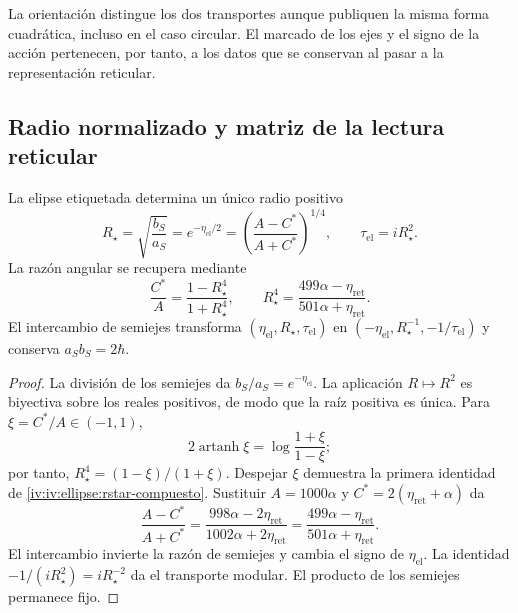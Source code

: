 La orientación distingue los dos transportes aunque publiquen
la misma forma cuadrática, incluso en el caso circular.
El marcado de los ejes y el signo de la acción pertenecen,
por tanto, a los datos que se conservan al pasar a la
representación reticular.

\subsection{Radio normalizado y matriz de la lectura reticular}
\label{iv:iv:ellipse:radio}

\begin{proposition}
\label{iv:iv:ellipse:radio-prop}
La elipse etiquetada determina un único radio positivo
\begin{equation}
 R_\star=\sqrt{\frac{b_S}{a_S}}
 =e^{-\eta_{\mathrm{el}}/2}
 =\left(\frac{A-C^*}{A+C^*}\right)^{1/4},
 \qquad \tau_{\mathrm{el}}=iR_\star^2.
 \label{iv:iv:ellipse:rstar}
\end{equation}
La razón angular se recupera mediante
\begin{equation}
 \frac{C^*}{A}=\frac{1-R_\star^4}{1+R_\star^4},
 \qquad
 R_\star^4=
 \frac{499\alpha-\eta_{\mathrm{ret}}}
      {501\alpha+\eta_{\mathrm{ret}}}.
 \label{iv:iv:ellipse:rstar-compuesto}
\end{equation}
El intercambio de semiejes transforma
\((\eta_{\mathrm{el}},R_\star,\tau_{\mathrm{el}})\) en
\((-\eta_{\mathrm{el}},R_\star^{-1},-1/\tau_{\mathrm{el}})\)
y conserva \(a_Sb_S=2\hbar\).
\end{proposition}
\begin{proof}
La división de los semiejes da \(b_S/a_S=e^{-\eta_{\mathrm{el}}}\).
La aplicación \(R\mapsto R^2\) es biyectiva sobre los reales
positivos, de modo que la raíz positiva es única.
Para \(\xi=C^*/A\in(-1,1)\),
\[
 2\operatorname{artanh}\xi
 =\log\frac{1+\xi}{1-\xi};
\]
por tanto, \(R_\star^4=(1-\xi)/(1+\xi)\).
Despejar \(\xi\) demuestra la primera identidad de
\eqref{iv:iv:ellipse:rstar-compuesto}. Sustituir
\(A=1000\alpha\) y
\(C^*=2(\eta_{\mathrm{ret}}+\alpha)\) da
\[
 \frac{A-C^*}{A+C^*}
 =\frac{998\alpha-2\eta_{\mathrm{ret}}}
        {1002\alpha+2\eta_{\mathrm{ret}}}
 =\frac{499\alpha-\eta_{\mathrm{ret}}}
        {501\alpha+\eta_{\mathrm{ret}}}.
\]
El intercambio invierte la razón de semiejes y cambia el
signo de \(\eta_{\mathrm{el}}\). La identidad
\(-1/(iR_\star^2)=iR_\star^{-2}\) da el transporte
modular. El producto de los semiejes permanece fijo.
\end{proof}

